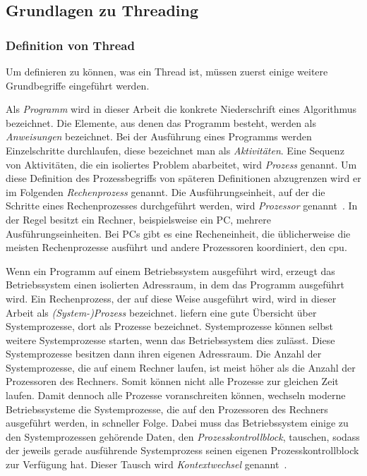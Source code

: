\subsection{Grundlagen zu Threading}


\subsubsection{Definition von Thread}
Um definieren zu können, was ein Thread ist, müssen zuerst einige weitere Grundbegriffe eingeführt werden. 

Als \emph{Programm} wird in dieser Arbeit die konkrete Niederschrift eines Algorithmus bezeichnet. Die Elemente, aus denen das Programm besteht, werden als \emph{Anweisungen} bezeichnet. Bei der Ausführung eines Programms werden Einzelschritte durchlaufen, diese bezeichnet man als \emph{Aktivitäten}. Eine Sequenz von Aktivitäten, die ein isoliertes Problem abarbeitet, wird \emph{Prozess} genannt. Um diese Definition des Prozessbegriffs von späteren Definitionen abzugrenzen wird er im Folgenden \emph{Rechenprozess} genannt. Die Ausführungseinheit, auf der die Schritte eines Rechenprozesses durchgeführt werden, wird \emph{Prozessor} genannt~\cite[S.~22]{Herrtwich1989}. In der Regel besitzt ein Rechner, beispielsweise ein PC, mehrere Ausführungseinheiten. Bei PCs gibt es eine Recheneinheit, die üblicherweise die meisten Rechenprozesse ausführt und andere Prozessoren koordiniert, den \ac{cpu}.

Wenn ein Programm auf einem Betriebssystem ausgeführt wird, erzeugt das Betriebssystem einen isolierten Adressraum, in dem das Programm ausgeführt wird. Ein Rechenprozess, der auf diese Weise ausgeführt wird, wird in dieser Arbeit als \emph{(System-)Prozess} bezeichnet. \textcite[Kapitel~2]{Tanenbaum2016} liefern eine gute Übersicht über Systemprozesse, dort als Prozesse bezeichnet. Systemprozesse können selbst weitere Systemprozesse starten, wenn das Betriebssystem dies zulässt. Diese Systemprozesse besitzen dann ihren eigenen Adressraum. Die Anzahl der Systemprozesse, die auf einem Rechner laufen, ist meist höher als die Anzahl der Prozessoren des Rechners. Somit können nicht alle Prozesse zur gleichen Zeit laufen. Damit dennoch alle Prozesse voranschreiten können, wechseln moderne Betriebssysteme die Systemprozesse, die auf den Prozessoren des Rechners ausgeführt werden, in schneller Folge. Dabei muss das Betriebssystem einige zu den Systemprozessen gehörende Daten, den \emph{Prozesskontrollblock}, tauschen, sodass der jeweils gerade ausführende Systemprozess seinen eigenen Prozesskontrollblock zur Verfügung hat. Dieser Tausch wird \emph{Kontextwechsel} genannt~\cite[S.~59]{Tanenbaum2016}.

